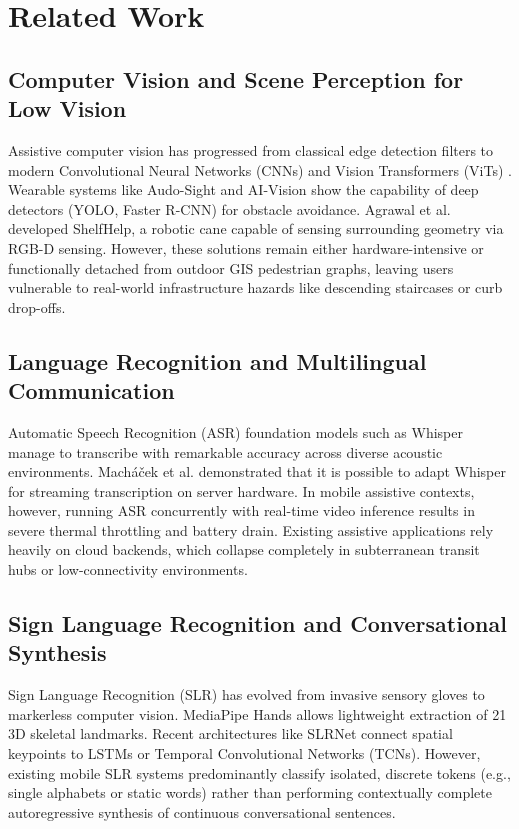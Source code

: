 \documentclass[conference]{IEEEtran}
\begin{document}
\section{Related Work}

\subsection{Computer Vision and Scene Perception for Low Vision}
Assistive computer vision has progressed from classical edge detection filters to modern Convolutional Neural Networks (CNNs) and Vision Transformers (ViTs) \cite{b2,b5}. Wearable systems like Audo-Sight \cite{b4} and AI-Vision \cite{b9} show the capability of deep detectors (YOLO, Faster R-CNN) for obstacle avoidance. Agrawal et al. \cite{b10} developed ShelfHelp, a robotic cane capable of sensing surrounding geometry via RGB-D sensing. However, these solutions remain either hardware-intensive or functionally detached from outdoor GIS pedestrian graphs, leaving users vulnerable to real-world infrastructure hazards like descending staircases or curb drop-offs.

\subsection{Language Recognition and Multilingual Communication}
Automatic Speech Recognition (ASR) foundation models such as Whisper \cite{b6} manage to transcribe with remarkable accuracy across diverse acoustic environments. Mach{\'a}{\v{c}}ek et al. \cite{b6} demonstrated that it is possible to adapt Whisper for streaming transcription on server hardware. In mobile assistive contexts, however, running ASR concurrently with real-time video inference results in severe thermal throttling and battery drain. Existing assistive applications rely heavily on cloud backends, which collapse completely in subterranean transit hubs or low-connectivity environments.

\subsection{Sign Language Recognition and Conversational Synthesis}
Sign Language Recognition (SLR) has evolved from invasive sensory gloves to markerless computer vision. MediaPipe Hands \cite{b11} allows lightweight extraction of 21 3D skeletal landmarks. Recent architectures like SLRNet \cite{b13} connect spatial keypoints to LSTMs or Temporal Convolutional Networks (TCNs). However, existing mobile SLR systems predominantly classify isolated, discrete tokens (e.g., single alphabets or static words) rather than performing contextually complete autoregressive synthesis of continuous conversational sentences.
\end{document}
